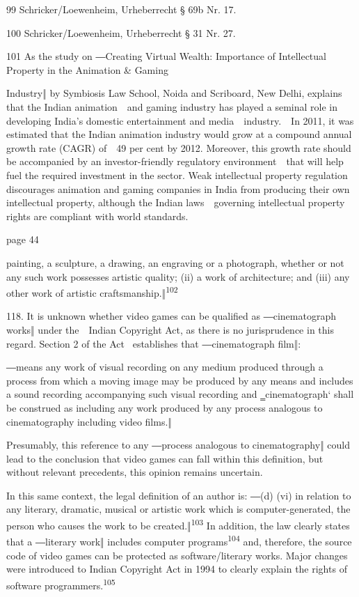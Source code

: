 \documentclass[
]{article}
\begin{document}
{99 }{Schricker/Loewenheim, Urheberrecht § 69b Nr. 17.}

{100 }{Schricker/Loewenheim, Urheberrecht § 31 Nr. 27.}

{101 }{As the study on }{―}{Creating Virtual Wealth: Importance of
Intellectual Property in the Animation \& Gaming}

{Industry}{‖ }{by Symbiosis Law School, Noida and Scriboard, New Delhi,
explains that the Indian animation~~and gaming industry has played }{a
seminal role in developing India's domestic }{entertainment and
media~~industry.~~In 2011, it was estimated that the Indian animation
industry would grow at a compound annual growth rate (CAGR) of~~49 per
cent by 2012. Moreover, this growth rate should be accompanied by an
investor-friendly regulatory environment~~that will help fuel the
required investment in the sector. Weak intellectual property regulation
discourages animation and gaming companies in India from producing their
own intellectual property, although the Indian laws~~governing
intellectual property rights are compliant with world standards.}

{page 44}

{painting, a sculpture, a drawing, an engraving or a photograph, whether
or not any such work possesses artistic quality; (ii) a work of
architecture; and (iii) any other work of artistic
cra}{ftsmanship.‖}\textsuperscript{{102}}

{118. }{It is unknown whether video games can be qualified as
―}{cinematograph works‖ }{under the~~Indian }{Copyright Act}{, as there
is no jurisprudence in this regard. Section 2 of the Act }{~establishes
that ―cinematograph film‖:}

{―}{means any work of visual recording on any medium produced through a
process from which a moving image may be produced by any means and
includes a sound recording }{accompanying such visual recording and
‗cinematograph` shall be construed as including }{any work produced by
any process analogous to cinematography including video films.}{‖}

{Presumably, this reference to any ―}{process analogous to
cinematography}{‖ could lead to }{the conclusion that video games can
fall within this definition, but without relevant precedents, this
opinion remains uncertain.}

{In this same context, the legal definition of an }{author }{is: ―}{(d)
(vi) in relation to any literary, dramatic, musical or artistic work
which is computer-generated, the person who causes }{the work to be
created.‖}\textsuperscript{{103 }}{In addition, the law clearly states
that a ―literary work‖ includes }{computer
programs}\textsuperscript{{104 }}{and, therefore, the source code of
video games can be protected as software/literary works. Major changes
were introduced to Indian }{Copyright Act }{in 1994 to clearly explain
the rights of software programmers.}\textsuperscript{{105}}
\end{document}
